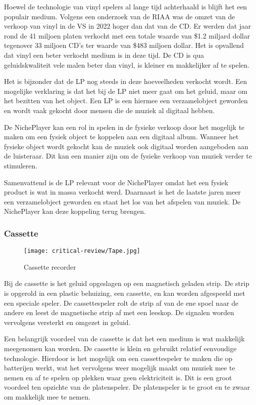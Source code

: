 Hoewel de technologie van vinyl spelers al lange tijd achterhaald is blijft het een populair medium. Volgens een onderzoek van de RIAA \cite{year_end_2022_RIAA_revenue_statistics} was de omzet van de verkoop van vinyl in de VS in 2022 hoger dan dat van de CD. Er werden dat jaar rond de 41 miljoen platen verkocht met een totale waarde van \$1.2 miljard dollar tegenover 33 miljoen CD's ter waarde van \$483 miljoen dollar. Het is opvallend dat vinyl een beter verkocht medium is in deze tijd. De CD is qua geluidskwaliteit vele malen beter dan vinyl, is kleiner en makkelijker af te spelen.

Het is bijzonder dat de LP nog steeds in deze hoeveelheden verkocht wordt. Een mogelijke verklaring is dat het bij de LP niet meer gaat om het geluid, maar om het bezitten van het object. Een LP is een hiermee een verzamelobject geworden en wordt vaak gekocht door mensen die de muziek al digitaal hebben.

De NichePlayer kan een rol in spelen in de fysieke verkoop door het mogelijk te maken om een fysiek object te koppelen aan een digitaal album. Wanneer het fysieke object wordt gekocht kan de muziek ook digitaal worden aangeboden aan de luisteraar. Dit kan een manier zijn om de fysieke verkoop van muziek verder te stimuleren.

Samenvattend is de LP relevant voor de NichePlayer omdat het een fysiek product is wat in massa verkocht werd. Daarnaast is het de laatste jaren meer een verzamelobject geworden en staat het los van het afspelen van muziek. De NichePlayer kan deze koppeling terug brengen.

\subsubsection*{Cassette}
\begin{wrapfigure}{r}{0.25\textwidth}
    \centering
    \texttt{[image: critical-review/Tape.jpg]}
    \caption{Cassette recorder}
    \label{fig:critical-review:tape}
\end{wrapfigure}
Bij de cassette is het geluid opgeslagen op een magnetisch geladen strip. De strip is opgerold in een plastic behuizing, een cassette, en kan worden afgespeeld met een speciale speler. De cassettespeler rolt de strip af van de ene spoel naar de andere en leest de magnetische strip af met een leeskop. De signalen worden vervolgens versterkt en omgezet in geluid.

Een belangrijk voordeel van de cassette is dat het een medium is wat makkelijk meegenomen kan worden. De cassette is klein en gebruikt relatief eenvoudige technologie. Hierdoor is het mogelijk om een cassettespeler te maken die op batterijen werkt, wat het vervolgens weer mogelijk maakt om muziek mee te nemen en af te spelen op plekken waar geen elektriciteit is. Dit is een groot voordeel ten opzichte van de platenspeler. De platenspeler is te groot en te zwaar om makkelijk mee te nemen.

